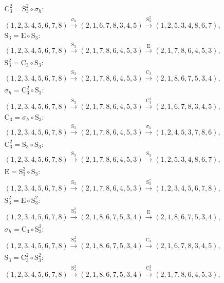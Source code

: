 \begin{align*}
& \mathrm{C}_{3}^{2} = \mathrm{S}_{3}^{2} \circ \sigma_{h}:\; \\& (1,2,3,4,5,6,7,8) \xrightarrow{\sigma_{h}} (2,1,6,7,8,3,4,5) \xrightarrow{\mathrm{S}_{3}^{2}} (1,2,5,3,4,8,6,7), \\
& \mathrm{S}_{3} = \mathrm{E} \circ \mathrm{S}_{3}:\; \\& (1,2,3,4,5,6,7,8) \xrightarrow{\mathrm{S}_{3}} (2,1,7,8,6,4,5,3) \xrightarrow{\mathrm{E}} (2,1,7,8,6,4,5,3), \\
& \mathrm{S}_{3}^{2} = \mathrm{C}_{3} \circ \mathrm{S}_{3}:\; \\& (1,2,3,4,5,6,7,8) \xrightarrow{\mathrm{S}_{3}} (2,1,7,8,6,4,5,3) \xrightarrow{\mathrm{C}_{3}} (2,1,8,6,7,5,3,4), \\
& \sigma_{h} = \mathrm{C}_{3}^{2} \circ \mathrm{S}_{3}:\; \\& (1,2,3,4,5,6,7,8) \xrightarrow{\mathrm{S}_{3}} (2,1,7,8,6,4,5,3) \xrightarrow{\mathrm{C}_{3}^{2}} (2,1,6,7,8,3,4,5), \\
& \mathrm{C}_{3} = \sigma_{h} \circ \mathrm{S}_{3}:\; \\& (1,2,3,4,5,6,7,8) \xrightarrow{\mathrm{S}_{3}} (2,1,7,8,6,4,5,3) \xrightarrow{\sigma_{h}} (1,2,4,5,3,7,8,6), \\
& \mathrm{C}_{3}^{2} = \mathrm{S}_{3} \circ \mathrm{S}_{3}:\; \\& (1,2,3,4,5,6,7,8) \xrightarrow{\mathrm{S}_{3}} (2,1,7,8,6,4,5,3) \xrightarrow{\mathrm{S}_{3}} (1,2,5,3,4,8,6,7), \\
& \mathrm{E} = \mathrm{S}_{3}^{2} \circ \mathrm{S}_{3}:\; \\& (1,2,3,4,5,6,7,8) \xrightarrow{\mathrm{S}_{3}} (2,1,7,8,6,4,5,3) \xrightarrow{\mathrm{S}_{3}^{2}} (1,2,3,4,5,6,7,8), \\
& \mathrm{S}_{3}^{2} = \mathrm{E} \circ \mathrm{S}_{3}^{2}:\; \\& (1,2,3,4,5,6,7,8) \xrightarrow{\mathrm{S}_{3}^{2}} (2,1,8,6,7,5,3,4) \xrightarrow{\mathrm{E}} (2,1,8,6,7,5,3,4), \\
& \sigma_{h} = \mathrm{C}_{3} \circ \mathrm{S}_{3}^{2}:\; \\& (1,2,3,4,5,6,7,8) \xrightarrow{\mathrm{S}_{3}^{2}} (2,1,8,6,7,5,3,4) \xrightarrow{\mathrm{C}_{3}} (2,1,6,7,8,3,4,5), \\
& \mathrm{S}_{3} = \mathrm{C}_{3}^{2} \circ \mathrm{S}_{3}^{2}:\; \\& (1,2,3,4,5,6,7,8) \xrightarrow{\mathrm{S}_{3}^{2}} (2,1,8,6,7,5,3,4) \xrightarrow{\mathrm{C}_{3}^{2}} (2,1,7,8,6,4,5,3), \\

\end{align*}
